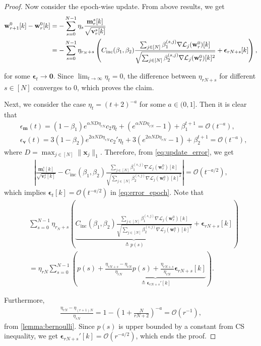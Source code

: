 \documentclass{article} %
\theoremstyle{plain}
\theoremstyle{definition}
\theoremstyle{remark}
\def\bigabs#1{\left|#1\right|}
\def\bigopen#1{\left(#1\right)}
\newcommand{\Ls}{\mathcal{L}}
\def\bm{{\mathbf m}}
\def\bx{{\mathbf x}}
\def\bw{{\mathbf w}}
\def\bv{{\mathbf v}}
\begin{document}
\begin{proof}
    Now consider the epoch-wise update. From above results, we get
    \begin{align} \label{eq:error_epoch}
        \bw_{r+1}^0[k]-\bw_r^0[k]&=-\sum_{s=0}^{N-1} \eta_s \frac{\bm_r^s[k]}{\sqrt{\bv_r^s[k]}} \notag \\
        &= -\sum_{s=0}^{N-1}\eta_{r_N+s} \bigopen{C_{\text{inc}}(\beta_1, \beta_2)\frac{\sum_{j \in [N]}\beta_1^{(s, j)}\nabla\Ls_{j}(\bw_r^0)[k]}{\sqrt{\sum_{j \in [N]}\beta_2^{(s, j)}\nabla\Ls_{j}(\bw_r^0)[k]^2}} + \boldsymbol{\epsilon}_{rN+s}[k]},
    \end{align}

    for some $\boldsymbol{\epsilon}_t \rightarrow \mathbf{0}$. Since $\lim_{t\rightarrow\infty} \eta_t=0$, the difference between $\eta_{rN+s}$ for different $s \in [N]$ converges to 0, which proves the claim.

    Next, we consider the case $\eta_t=(t+2)^{-a}$ for some $a \in (0, 1]$.  Then it is clear that
    \begin{align*}
        &\epsilon_\bm(t)=(1-\beta_1)e^{\alpha ND \eta_{rN}}c_2\eta_t+(e^{\alpha ND \eta_{rN}}-1)+\beta_1^{t+1} = \mathcal{O}(t^{-a}), \\
        &\epsilon_\bv(t)=3(1-\beta_2)e^{2\alpha ND \eta_{rN}}c_2'\eta_t+3(e^{2\alpha ND \eta_{rN}}-1)+\beta_2^{t+1} = \mathcal{O}(t^{-a}),
    \end{align*}
    where $D = \max_{j\in[N]} \|\bx_j\|_1$.
    Therefore, from \cref{eq:update_error}, we get
    \begin{align*}
        \bigabs{\frac{\bm_r^s[k]}{\sqrt{\bv_r^s[k]}}-C_{\text{inc}}(\beta_1, \beta_2)\frac{\sum_{j \in [N]}\beta_1^{(s, j)}\nabla\Ls_{j}(\bw_r^0)[k]}{\sqrt{\sum_{j \in [N]}\beta_2^{(s, j)}\nabla\Ls_{j}(\bw_r^0)[k]^2}}} = \mathcal{O}(t^{-a/2}),
    \end{align*}
    which implies $\boldsymbol{\epsilon}_t[k] = \mathcal{O}(t^{-a/2})$ in \cref{eq:error_epoch}. Note that
    \begin{align*}
        &\sum_{s=0}^{N-1}\eta_{r_N+s} \bigopen{\underbrace{C_{\text{inc}}(\beta_1, \beta_2)\frac{\sum_{j \in [N]}\beta_1^{(s, j)}\nabla\Ls_{j}(\bw_r^0)[k]}{\sqrt{\sum_{j \in [N]}\beta_2^{(s, j)}\nabla\Ls_{j}(\bw_r^0)[k]^2}}}_{\triangleq p(s)} + \boldsymbol{\epsilon}_{rN+s}[k]} \\
        &=\eta_{rN}\sum_{s=0}^{N-1}\bigopen{p(s) + \underbrace{\frac{\eta_{rN+s}-\eta_{rN}}{\eta_{rN}}p(s) + \frac{\eta_{rN+s}}{\eta_{rN}}\boldsymbol{\epsilon}_{rN+s}[k]}_{\triangleq \boldsymbol{\epsilon}_{rN+s}'[k]}}.
    \end{align*}

    Furthermore,
    \begin{align*}
        \frac{\eta_{rN}-\eta_{(r+1)N}}{\eta_{rN}} = 1-\bigopen{1+\frac{N}{rN+2}}^{-a} = \mathcal{O}(r^{-1}),
    \end{align*}
    from \cref{lemma:bernoulli}. Since $p(s)$ is upper bounded by a constant from CS inequality, we get $\boldsymbol{\epsilon}_{rN+s}'[k] = \mathcal{O}(r^{-a/2})$, which ends the proof.
\end{proof}
\end{document}
